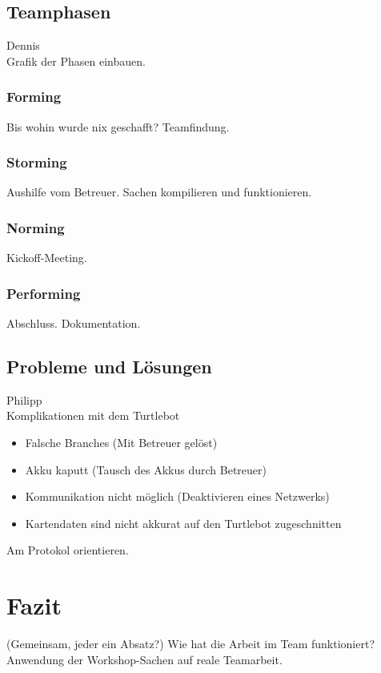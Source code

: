 \documentclass[a4paper,12pt,headsepline,toc=flat]{scrartcl}
\begin{document}
	\subsection{Teamphasen}
		Dennis\\
		Grafik der Phasen einbauen.
	\subsubsection{Forming}
		Bis wohin wurde nix geschafft? Teamfindung.
	\subsubsection{Storming}
		Aushilfe vom Betreuer. Sachen kompilieren und funktionieren.
	\subsubsection{Norming}
		Kickoff-Meeting. 
	\subsubsection{Performing}
		Abschluss. Dokumentation.
	\subsection{Probleme und Lösungen}
		Philipp\\
		Komplikationen mit dem Turtlebot
		\begin{itemize}
			\item Falsche Branches (Mit Betreuer gelöst)
			\item Akku kaputt (Tausch des Akkus durch Betreuer)
			\item Kommunikation nicht möglich (Deaktivieren eines Netzwerks)
			\item Kartendaten sind nicht akkurat auf den Turtlebot zugeschnitten
		\end{itemize}
		Am Protokol orientieren.
	\section{Fazit}
		(Gemeinsam, jeder ein Absatz?)
		Wie hat die Arbeit im Team funktioniert? Anwendung der Workshop-Sachen auf reale Teamarbeit.
\end{document}
